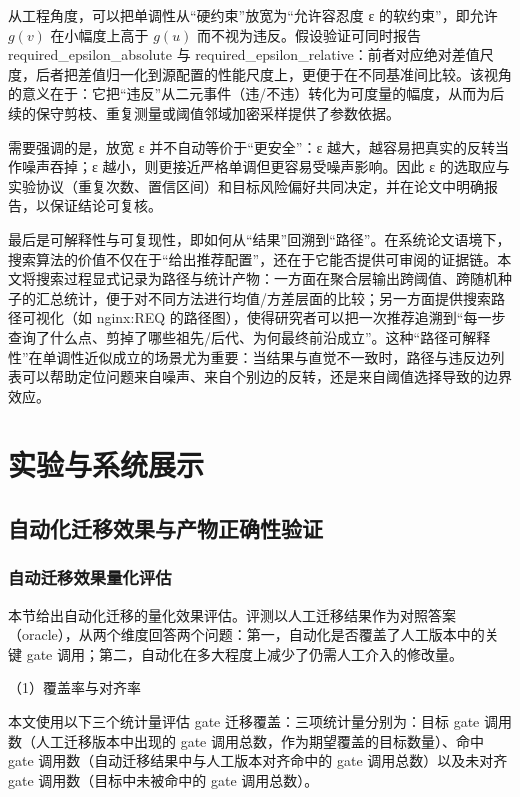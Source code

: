 \documentclass[UTF8,a4paper,12pt]{ctexart}
\numberwithin{equation}{section}
\begin{document}
从工程角度，可以把单调性从``硬约束''放宽为``允许容忍度 ε
的软约束''，即允许 \(g(v)\) 在小幅度上高于 \(g(u)\)
而不视为违反。假设验证可同时报告 required\_epsilon\_absolute 与
required\_epsilon\_relative：前者对应绝对差值尺度，后者把差值归一化到源配置的性能尺度上，更便于在不同基准间比较。该视角的意义在于：它把``违反''从二元事件（违/不违）转化为可度量的幅度，从而为后续的保守剪枝、重复测量或阈值邻域加密采样提供了参数依据。

需要强调的是，放宽 ε 并不自动等价于``更安全''：ε
越大，越容易把真实的反转当作噪声吞掉；ε
越小，则更接近严格单调但更容易受噪声影响。因此 ε
的选取应与实验协议（重复次数、置信区间）和目标风险偏好共同决定，并在论文中明确报告，以保证结论可复核。

最后是可解释性与可复现性，即如何从``结果''回溯到``路径''。在系统论文语境下，搜索算法的价值不仅在于``给出推荐配置''，还在于它能否提供可审阅的证据链。本文将搜索过程显式记录为路径与统计产物：一方面在聚合层输出跨阈值、跨随机种子的汇总统计，便于对不同方法进行均值/方差层面的比较；另一方面提供搜索路径可视化（如
nginx:REQ
的路径图），使得研究者可以把一次推荐追溯到``每一步查询了什么点、剪掉了哪些祖先/后代、为何最终前沿成立''。这种``路径可解释性''在单调性近似成立的场景尤为重要：当结果与直觉不一致时，路径与违反边列表可以帮助定位问题来自噪声、来自个别边的反转，还是来自阈值选择导致的边界效应。


\section{实验与系统展示}

\subsection{自动化迁移效果与产物正确性验证}


\subsubsection{自动迁移效果量化评估}
本节给出自动化迁移的量化效果评估。评测以人工迁移结果作为对照答案（oracle），从两个维度回答两个问题：第一，自动化是否覆盖了人工版本中的关键
gate 调用；第二，自动化在多大程度上减少了仍需人工介入的修改量。

（1）覆盖率与对齐率

本文使用以下三个统计量评估 gate 迁移覆盖：三项统计量分别为：目标 gate 调用数（人工迁移版本中出现的 gate
调用总数，作为期望覆盖的目标数量）、命中 gate
调用数（自动迁移结果中与人工版本对齐命中的 gate 调用总数）以及未对齐
gate 调用数（目标中未被命中的 gate 调用总数）。
\end{document}
